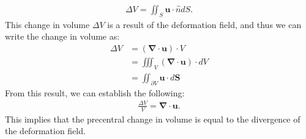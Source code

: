 \documentclass[a4paper]{article}
\newcommand{\dive}[1]{\mathbf{\nabla}\cdot \mathbf{#1}}
\begin{document}
\begin{align*}
    \Delta V = \iint_{S}\mathbf{u}\cdot\hat{n}dS.
\end{align*}This change in volume $\Delta V$ is a result of the deformation field, and thus we can write the change in volume as:
\begin{align*}
    \Delta V &= \left(\dive{u}\right)\cdot V\\
    &= \iiint_{V} \left(\dive{u}\right)\cdot dV\\
    &= \iint_{\partial V}\mathbf{u}\cdot d\mathbf{S}
\end{align*}From this result, we can establish the following:
\begin{align*}
    \frac{\Delta V}{V} = \dive{u}.
\end{align*} This implies that the precentral change in volume is equal to the divergence of the deformation field.
\end{document}

